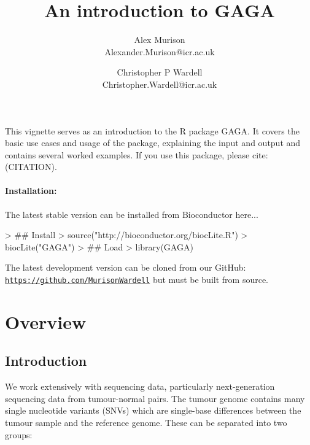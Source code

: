 \documentclass{article}
\begin{document}


\title{An introduction to GAGA}
\author{
  Alex Murison\\
  Alexander.Murison@icr.ac.uk
  \and
  Christopher P Wardell\\
  Christopher.Wardell@icr.ac.uk
}
\maketitle

This vignette serves as an introduction to the R package GAGA.  It covers the basic use cases and usage of the package, explaining the input and output and contains several worked examples.  If you use this package, please cite: (CITATION).

\paragraph{Installation:} The latest stable version can be installed from Bioconductor here...
 
\begin{Schunk}
\begin{Sinput}
> ## Install
> source("http://bioconductor.org/biocLite.R")
> biocLite("GAGA")
> ## Load
> library(GAGA)
\end{Sinput}
\end{Schunk}

The latest development version can be cloned from our GitHub:\\ \texttt{\href{https://github.com/MurisonWardell}{https://github.com/MurisonWardell}} but must be built from source.

\pagebreak
\tableofcontents
\pagebreak

\section{Overview}
\subsection{Introduction}
We work extensively with sequencing data, particularly next-generation sequencing data from tumour-normal pairs.  The tumour genome contains many single nucleotide variants (SNVs) which are single-base differences between the tumour sample and the reference genome.  These can be separated into two groups:
\end{document}

